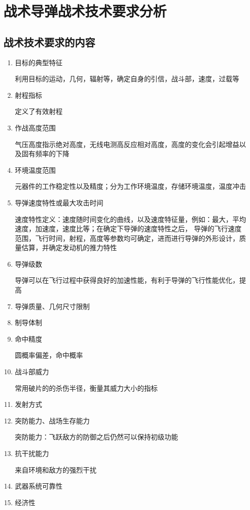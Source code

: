 \chapter{战术导弹战术技术要求分析}
\section{战术技术要求的内容}
\begin{enumerate}[1.]
    \item 目标的典型特征
    
    {\kaishu 利用目标的运动，几何，辐射等，确定自身的引信，战斗部，速度，过载等}
    \item 射程指标
    
    {\kaishu 定义了有效射程}
    \item 作战高度范围
    
    {\kaishu 气压高度指示绝对高度，无线电测高反应相对高度，高度的变化会引起增益以及固有频率的下降}
    \item 环境温度范围
    
    {\kaishu 元器件的工作稳定性以及精度；分为工作环境温度，存储环境温度，温度冲击}
    \item 导弹速度特性或最大攻击时间
    
    {\kaishu 速度特性定义：速度随时间变化的曲线，以及速度特征量，例如：最大，平均速度，加速度，速度比等；在确定下导弹的速度特性之后，
    导弹的飞行速度范围，飞行时间，射程，高度等参数均可确定，进而进行导弹的外形设计，质量估算，并确定发动机的推力特性}
    \item 导弹级数
    
    {\kaishu 导弹可以在飞行过程中获得良好的加速性能，有利于导弹的飞行性能优化，提高}
    \item 导弹质量、几何尺寸限制
    \item 制导体制
    \item 命中精度
    
    {\kaishu 圆概率偏差，命中概率}
    \item 战斗部威力
    
    {\kaishu 常用破片的的杀伤半径，衡量其威力大小的指标}
    \item 发射方式
    \item 突防能力、战场生存能力
    
    {\kaishu 突防能力：飞跃敌方的防御之后仍然可以保持初级功能}
    \item 抗干扰能力
    
    {\kaishu 来自环境和敌方的强烈干扰}
    \item 武器系统可靠性
    \item 经济性
\end{enumerate}